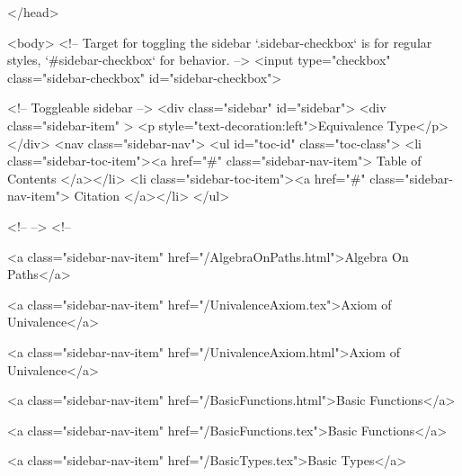   
</head>




  <body>
    <!-- Target for toggling the sidebar `.sidebar-checkbox` is for regular
     styles, `#sidebar-checkbox` for behavior. -->
<input type="checkbox" class="sidebar-checkbox" id="sidebar-checkbox">

<!-- Toggleable sidebar -->
<div class="sidebar" id="sidebar">
  <div class="sidebar-item" >
    <p style="text-decoration:left">Equivalence Type</p>
  </div>
  <nav class="sidebar-nav">
    <ul id="toc-id" class="toc-class">
  <li class="sidebar-toc-item"><a href="#" class="sidebar-nav-item"> Table of Contents </a></li>
  <li class="sidebar-toc-item"><a href="#" class="sidebar-nav-item"> Citation </a></li>
</ul>


    <!--  -->
    <!-- 
      
    
      
    
      
    
      
        
      
    
      
        
          <a class="sidebar-nav-item" href="/AlgebraOnPaths.html">Algebra On Paths</a>
        
      
    
      
        
          <a class="sidebar-nav-item" href="/UnivalenceAxiom.tex">Axiom of Univalence</a>
        
      
    
      
        
          <a class="sidebar-nav-item" href="/UnivalenceAxiom.html">Axiom of Univalence</a>
        
      
    
      
        
          <a class="sidebar-nav-item" href="/BasicFunctions.html">Basic Functions</a>
        
      
    
      
        
          <a class="sidebar-nav-item" href="/BasicFunctions.tex">Basic Functions</a>
        
      
    
      
        
          <a class="sidebar-nav-item" href="/BasicTypes.tex">Basic Types</a>
        
      
    
      
        
